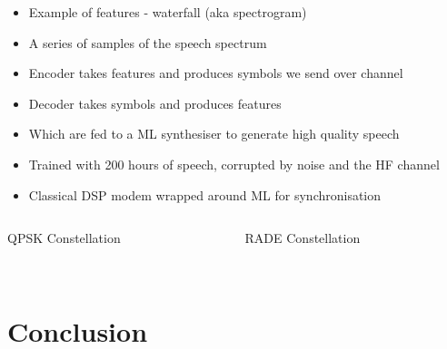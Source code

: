 \documentclass{beamer}
\begin{document}
\begin{frame}
\begin{itemize}
	\item Example of features - waterfall (aka spectrogram)
	\item A series of samples of the speech spectrum
	\item Encoder takes features and produces symbols we send over channel
	\item Decoder takes symbols and produces features
	\item Which are fed to a ML synthesiser to generate high quality speech
	\item Trained with 200 hours of speech, corrupted by noise and the HF channel
	\item Classical DSP modem wrapped around ML for synchronisation
\end{itemize}
\end{frame}

\begin{frame}

\begin{columns}
\begin{column}{0.5\textwidth}
  \begin{center}
  QPSK Constellation \\~\\
  \end{center}
\end{column}
\begin{column}{0.5\textwidth}  %
  \begin{center}
  RADE Constellation \\~\\
  \end{center}
\end{column}
\end{columns}

\end{frame}

\section{Conclusion}
\end{document}
